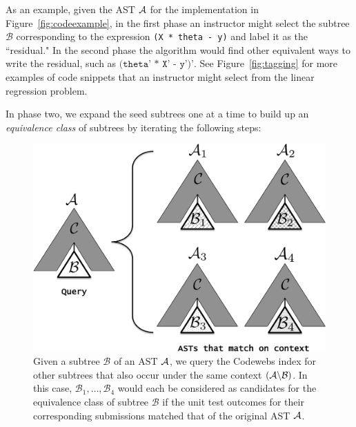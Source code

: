 As an example, given the AST $\mathcal{A}$ for the implementation in 
Figure~\ref{fig:codeexample},
 in the first phase an instructor might select the subtree $\mathcal{B}$ corresponding to the expression \texttt{(X * theta - y)} and label it as the ``residual." In the second phase the algorithm would find other equivalent ways to write the residual, such as $\texttt{(theta' * X' - y')'}$.
See Figure~\ref{fig:tagging} for more  examples of code snippets that an instructor might select from the linear
 regression problem.

In phase two, we expand the seed subtrees one at a time to build up an \emph{equivalence class}
of subtrees by iterating the following steps:
		
\begin{figure}[t!]
\center
\includegraphics[width=.35\textwidth]{img/cartoon.pdf}
\caption{
Given a subtree $\mathcal{B}$ of an AST $\mathcal{A}$, we query the Codewebs index
for other subtrees that also occur under the same context $(\mathcal{A}\backslash\mathcal{B})$.
In this case, $\mathcal{B}_1, \dots, \mathcal{B}_4$ would each be considered
as candidates for the equivalence class of subtree $\mathcal{B}$ if the unit test outcomes for their
corresponding submissions matched that of the original AST $\mathcal{A}$.
}
\label{fig:cartoon}
\end{figure}

